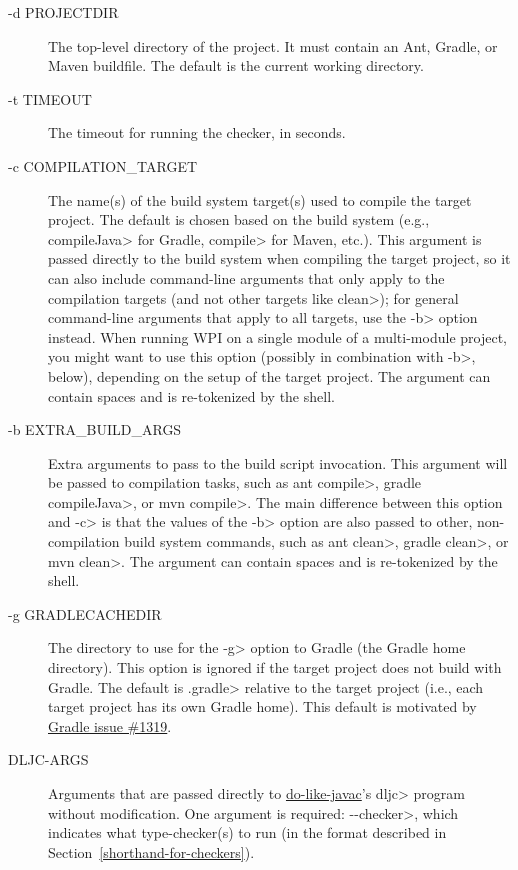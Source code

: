 \begin{description}
\item[-d PROJECTDIR]
  The top-level directory of the project.  It must contain an Ant, Gradle,
  or Maven buildfile. The default is the current working directory.

\item[-t TIMEOUT]
  The timeout for running the checker, in seconds.

\item[-c COMPILATION\_TARGET]
  The name(s) of the build system target(s) used to compile
  the target project. The default is chosen based on the build
  system (e.g., \<compileJava> for Gradle, \<compile> for Maven, etc.).
  This argument is passed directly to the build system when compiling the
  target project, so it can also include command-line arguments that only
  apply to the compilation targets (and not other targets like \<clean>);
  for general command-line arguments that apply to all targets, use the
  \<-b> option instead.
  When running WPI on a single module of a multi-module project,
  you might want to use this option (possibly in combination with \<-b>, below),
  depending on the setup of the target project.
  The argument can contain spaces and is re-tokenized by the shell.

\item[-b EXTRA\_BUILD\_ARGS]
  Extra arguments to pass to the build script invocation. This argument
  will be passed to compilation tasks, such as
  \<ant compile>, \<gradle compileJava>, or \<mvn compile>.
  The main difference between this option and \<-c> is that the values
  of the \<-b> option are also passed to other, non-compilation build system commands, such as
  \<ant clean>, \<gradle clean>, or \<mvn clean>.
  The argument can contain spaces and is re-tokenized by the shell.

\item[-g GRADLECACHEDIR]
  The directory to use for the \<-g> option to Gradle (the Gradle home
  directory). This option is ignored if the target project does not
  build with Gradle. The default is \<.gradle> relative to the target
  project (i.e., each target project has its own Gradle home). This default
  is motivated by
  \href{https://github.com/gradle/gradle/issues/1319}{Gradle issue \#1319}.

\label{DLJC-ARGS}
\item[DLJC-ARGS]
  Arguments that are passed directly to
  \href{https://github.com/kelloggm/do-like-javac}{do-like-javac}'s
  \<dljc> program without
  modification.  One argument is required: \<-\relax-checker>, which indicates
  what type-checker(s) to run (in the format described in Section~\ref{shorthand-for-checkers}).


\end{description}
